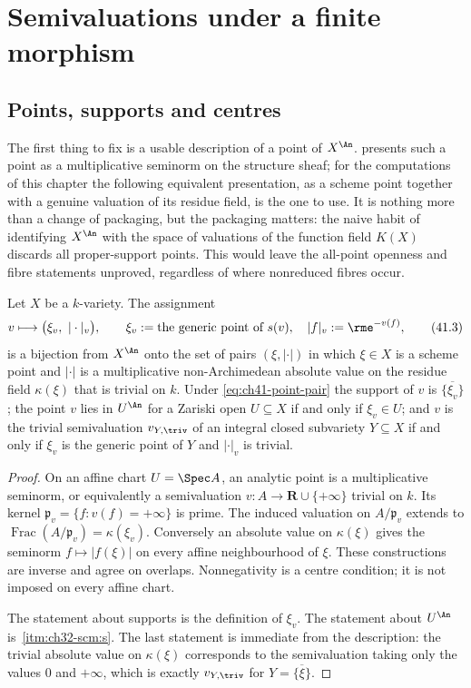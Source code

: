 \section{Semivaluations under a finite morphism}
\label{sec:ch41-finite-analytic}

\subsection{Points, supports and centres}
\label{sec:ch41-points}

The first thing to fix is a usable description of a point of $X^{\An}$.
 presents such a point as a multiplicative
seminorm on the structure sheaf; for the computations of this chapter the
following equivalent presentation, as a scheme point together with a genuine
valuation of its residue field, is the one to use.  It is nothing more than
a change of packaging, but the packaging matters: the naive habit of
identifying $X^{\An}$ with the space of valuations of the function field
$K(X)$ discards all proper-support points.  This would leave the
all-point openness and fibre statements unproved, regardless of where
nonreduced fibres occur.

\begin{lemma}
\label{lem:ch41-point-pair}
Let $X$ be a $k$-variety.  The assignment
\[
 v\longmapsto
 \bigl(\xi_v,\ |\cdot|_v\bigr),
 \qquad
 \xi_v:=\text{the generic point of }s(v),
 \quad
 |f|_v:=\rme^{-v(f)},
\tag{41.3}\label{eq:ch41-point-pair}
\]
is a bijection from $X^{\An}$ onto the set of pairs $(\xi,|\cdot|)$ in
which $\xi\in X$ is a scheme point and $|\cdot|$ is a multiplicative
non-Archimedean absolute value on the residue field $\kappa(\xi)$ that is
trivial on $k$.  Under \eqref{eq:ch41-point-pair} the support of $v$ is
$\overline{\{\xi_v\}}$; the point $v$ lies in $U^{\An}$ for a Zariski
open $U\subseteq X$ if and only if $\xi_v\in U$; and $v$ is the
trivial semivaluation $v_{Y,\triv}$ of an integral closed subvariety
$Y\subseteq X$ if and only if $\xi_v$ is the generic point of $Y$ and
$|\cdot|_v$ is trivial.
\end{lemma}

\begin{proof}
On an affine chart $U=\Spec A$, an analytic point is a multiplicative
seminorm, or equivalently a semivaluation
$v:A\to\mathbf R\cup\{+\infty\}$ trivial on $k$.
Its kernel $\mathfrak p_v=\{f:v(f)=+\infty\}$ is prime.
The induced valuation on $A/\mathfrak p_v$ extends to
$\operatorname{Frac}(A/\mathfrak p_v)=\kappa(\xi_v)$.
Conversely an absolute value on $\kappa(\xi)$ gives the seminorm
$f\mapsto|f(\xi)|$ on every affine neighbourhood of $\xi$.
These constructions are inverse and agree on overlaps.  Nonnegativity
is a centre condition; it is not imposed on every affine chart.

The statement about supports is the definition of $\xi_v$.  The statement
about $U^{\An}$ is
\,\cref{itm:ch32-scm:s}.  The last
statement is immediate from the description: the trivial absolute value on
$\kappa(\xi)$ corresponds to the semivaluation taking only the values
$0$ and $+\infty$, which is exactly $v_{Y,\triv}$ for
$Y=\overline{\{\xi\}}$.
\end{proof}

